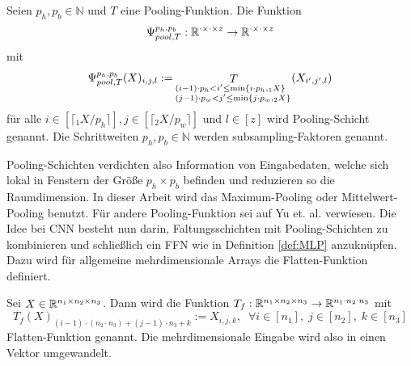 \begin{defi}
    Seien $p_h, p_b \in \mathbb{N}$ und $T$ eine Pooling-Funktion. Die Funktion 
    \begin{equation*}
        \Psi_{pool,T}^{p_h,p_b}: \mathbb{R}^{\cdot \times \cdot \times z} \rightarrow \mathbb{R}^{\cdot \times \cdot\times z}
    \end{equation*}
    mit
    \begin{equation*}
        \Psi_{pool,T}^{p_h,p_b}(X)_{i,j,l}:= \mathop{T}_{\begin{subarray}{l}(i-1) \cdot p_h < i' \leq \min\{i \cdot p_h, {}_1 X\} \\ 
        (j-1) \cdot p_w < j' \leq \min\{j \cdot p_w, {}_2 X\}\end{subarray}} (X_{i',j',l})  
    \end{equation*}
    für alle  $i \in [\lceil {}_1 X/p_h \rceil], j \in [\lceil {}_2 X/p_w \rceil]$ und $l \in [z]$ wird Pooling-Schicht genannt. Die Schrittweiten $p_h, p_b \in \mathbb{N}$ werden subsampling-Faktoren genannt.
\end{defi}

Pooling-Schichten verdichten also Information von Eingabedaten, welche sich lokal in Fenstern der Größe $p_h \times p_b$ befinden und reduzieren so die Raumdimension. In dieser Arbeit wird das Maximum-Pooling oder Mittelwert-Pooling benutzt. Für andere Pooling-Funktion sei auf Yu et. al.\cite{yu2014mixed} verwiesen.
Die Idee bei CNN besteht nun darin, Faltungsschichten mit Pooling-Schichten zu kombinieren und schließlich ein FFN wie in Definition \ref{def:MLP} anzuknüpfen.
Dazu wird für allgemeine mehrdimensionale Arrays die Flatten-Funktion definiert.

\begin{defi}
    \label{def:flatten}
    Sei $X \in \mathbb{R}^{n_1 \times n_2 \times n_3}$. Dann wird die Funktion $T_f:\mathbb{R}^{n_1 \times n_2 \times n_3} \rightarrow \mathbb{R}^{n_1 \cdot n_2 \cdot n_3}$ mit 
    \begin{equation*}
        T_f(X)_{(i-1) \cdot (n_2 \cdot n_3)+(j-1) \cdot n_3+k}:= X_{i,j,k}, \; \; \forall i \in [n_1],\; j \in [n_2],\; k \in [n_3]
    \end{equation*}
    Flatten-Funktion genannt. Die mehrdimensionale Eingabe wird also in einen Vektor umgewandelt.
\end{defi}

